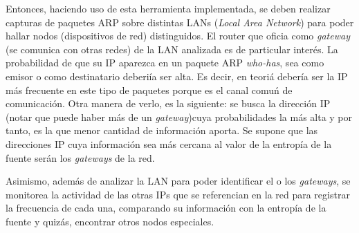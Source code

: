 Entonces, haciendo uso de esta herramienta implementada, se deben realizar capturas de paquetes ARP
sobre distintas LANs (\emph{Local Area Network}) para poder hallar nodos (dispositivos de red) 
distinguidos. El router que oficia como \emph{gateway} (se comunica con otras redes) de la LAN 
analizada es de particular inter\'es. La probabilidad de que su IP aparezca en un paquete ARP 
\emph{who-has}, sea como emisor o como destinatario deberi\'ia ser alta. Es decir, en teori\'a 
deber\'ia ser la IP m\'as frecuente en este tipo de paquetes porque es el canal comu\'n de 
comunicaci\'on. Otra manera de verlo, es la siguiente: se busca la direcci\'on IP (notar que puede
haber m\'as de un \emph{gateway})cuya probabilidades la m\'as alta y por tanto, es la que menor 
cantidad de informaci\'on aporta. Se supone que las direcciones IP cuya informaci\'on sea m\'as 
cercana al valor de la entrop\'ia de la fuente ser\'an los \emph{gateways} de la red.

Asimismo, adem\'as de analizar la LAN para poder identificar el o los \emph{gateways}, se monitorea
la actividad de las otras IPs que se referencian en la red para registrar la frecuencia de cada 
una, comparando su informaci\'on con la entrop\'ia de la fuente y quiz\'as, encontrar otros nodos
especiales.















